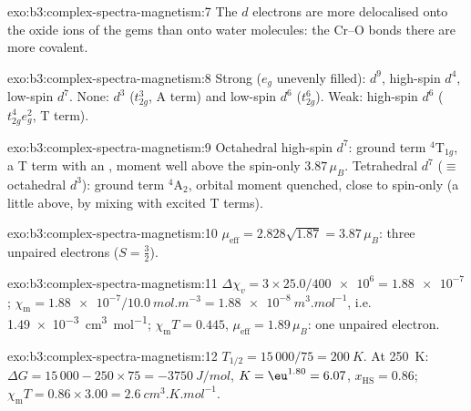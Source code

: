 \begin{solution}{exo:b3:complex-spectra-magnetism:7}
The $d$ electrons are more delocalised onto the oxide ions of the gems than onto
water molecules: the Cr--O bonds there are more covalent.
\end{solution}

\begin{solution}{exo:b3:complex-spectra-magnetism:8}
Strong ($e_g$ unevenly filled): $d^9$, high-spin $d^4$, low-spin $d^7$. None: $d^3$ ($t_{2g}^3$, A term) and
low-spin $d^6$ ($t_{2g}^6$). Weak: high-spin $d^6$ ($t_{2g}^4e_g^2$, T term).
\end{solution}

\begin{solution}{exo:b3:complex-spectra-magnetism:9}
Octahedral high-spin $d^7$: ground term $^4$T$_{1g}$, a T term with an ,
moment well above the spin-only $3.87\,\mu_B$. Tetrahedral $d^7$ ($\equiv$ octahedral $d^3$): ground
term $^4$A$_2$, orbital moment quenched, close to spin-only (a little above, by
mixing with excited T terms).
\end{solution}

\begin{solution}{exo:b3:complex-spectra-magnetism:10}
$\mu_{\mathrm{eff}} = 2.828\sqrt{1.87} = 3.87\,\mu_B$: three unpaired electrons ($S = \frac32$).
\end{solution}

\begin{solution}{exo:b3:complex-spectra-magnetism:11}
$\Delta\chi_v = 3 \times 25.0/\num{400e6} = \num{1.88e-7}$; $\chi_{\mathrm m} = \num{1.88e-7}/\qty{10.0}{mol.m^{-3}} = \qty{1.88e-8}{m^3.mol^{-1}}$, i.e.
\qty{1.49e-3}{cm^3.mol^{-1}}; $\chi_{\mathrm m}T = 0.445$, $\mu_{\mathrm{eff}} = 1.89\,\mu_B$: one unpaired electron.
\end{solution}

\begin{solution}{exo:b3:complex-spectra-magnetism:12}
$T_{1/2} = 15\,000/75 = \qty{200}{K}$. At \qty{250}{K}: $\Delta G = 15\,000 - 250 \times 75 = \qty{-3750}{J/mol}$, $K = \eu^{1.80} = 6.07$,
$x_{\mathrm{HS}} = 0.86$; $\chi_{\mathrm m}T = 0.86 \times 3.00 = \qty{2.6}{cm^3.K.mol^{-1}}$.
\end{solution}

